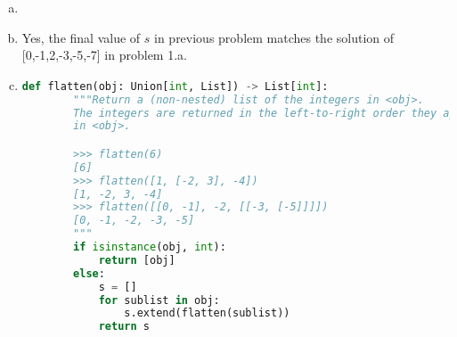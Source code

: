 \documentclass[12pt]{article}
\begin{document}
\begin{enumerate}[a.]
    \item

    \item Yes, the final value of $s$ in previous problem matches the solution of
    [0,-1,2,-3,-5,-7] in problem 1.a.

    \item

    \begin{lstlisting}[language=Python]
    def flatten(obj: Union[int, List]) -> List[int]:
        """Return a (non-nested) list of the integers in <obj>.
        The integers are returned in the left-to-right order they appear
        in <obj>.

        >>> flatten(6)
        [6]
        >>> flatten([1, [-2, 3], -4])
        [1, -2, 3, -4]
        >>> flatten([[0, -1], -2, [[-3, [-5]]]])
        [0, -1, -2, -3, -5]
        """
        if isinstance(obj, int):
            return [obj]
        else:
            s = []
            for sublist in obj:
                s.extend(flatten(sublist))
            return s
    \end{lstlisting}

\end{enumerate}
\end{document}
